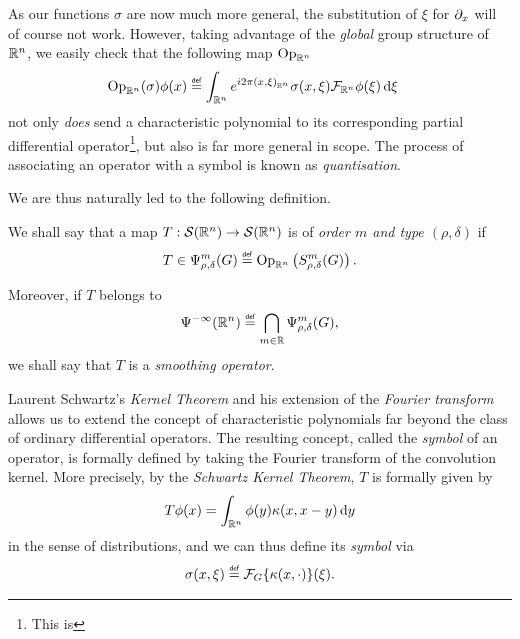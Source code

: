 As our functions $\sigma$ are now much more general,
the substitution of $\xi$ for $\iD x$ will of course not work.
However, taking advantage of the \emph{global} group structure of $\R^n$,
we easily check that the following map $\Op [\R^n]$
\begin{align}
    \Op [\R^n] (\sigma) \phi(x)
    &\defeq \int_{\R^n} \e^{\i \turn \ip [\R^n] x \xi} \sigma(x, \xi) \Fourier [\R^n] \phi(\xi) \dd \xi
    \label{eq:intro:Euclidean:quantisation}
\end{align}
not only \emph{does} send a characteristic polynomial to its corresponding partial differential operator\footnote{%
    This is
},
but also is far more general in scope.
The process of associating an operator with a symbol is known as \emph{quantisation}.

We are thus naturally led to the following definition.
\begin{definition}
    We shall say that a map $T : \Schwartz {\R^n} \to \Schwartz {\R^n}$ is of \emph{order $m$ and type $(\rho, \delta)$} if
    \begin{align*}
        T \in \OperatorClass m {\rho, \delta}
        \defeq \Op [\R^n] \left(\SymbolClass m {\rho, \delta}\right).
    \end{align*}

    Moreover,
    if $T$ belongs to
    \begin{align*}
        \SmoothingOperators [\R^n] \defeq \bigcap_{m \in \R} \OperatorClass m {\rho, \delta},
    \end{align*}
    we shall say that $T$ is a \emph{smoothing operator}.
\end{definition}

Laurent Schwartz's \emph{Kernel Theorem} and his extension of the \emph{Fourier transform} allows us to extend the concept of characteristic polynomials far beyond the class of ordinary differential operators.
The resulting concept, called the \emph{symbol} of an operator,
is formally defined by taking the Fourier transform of the convolution kernel.
More precisely,
by the \emph{Schwartz Kernel Theorem},
$T$ is formally given by
\begin{align*}
    T \phi(x) = \int_{\R^n} \phi(y) \kappa(x, x - y) \dd y
\end{align*}
in the sense of distributions,
and we can thus define its \emph{symbol} via
\begin{align*}
    \sigma(x, \xi) \defeq \Fourier \{\kappa(x, \dummy)\}(\xi).
\end{align*}

